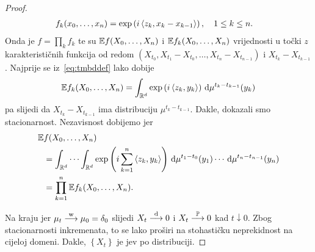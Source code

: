 \documentclass[main.tex]{subfiles}
\begin{document}
\begin{proof}
\begin{equation}
\begin{aligned}
			 & f_k(x_0, \ldots, x_n) = \exp \left( i \left\langle {z_k}, {x_k-x_{k-1}} \right\rangle \right), \quad 1 \le k \le n.
		\end{aligned}
	\end{equation}
	Onda je \( f = \prod_k f_k \) te su \( \mathbb{E} f(X_0, \ldots, X_n) \) i \( \mathbb{E} f_k(X_0, \ldots, X_n) \)
	vrijednosti u točki \( z \) karakterističnih funkcija od redom \( (X_{t_0}, X_{t_1}-X_{t_0},\ldots, X_{t_n}-X_{t_{n-1}}) \) i \( X_{t_k}-X_{t_{k-1}} \). Najprije se iz~\eqref{eq:tmbddef} lako dobije
	\begin{equation}
		\mathbb{E} f_k(X_0, \ldots, X_n) = \int_{\mathbb{R}^d} \exp\left(i\left\langle {z_k}, {y_k} \right\rangle\right) \,\mathrm d \mu^{t_k-t_{k-1}} (y_k)
	\end{equation}
	pa slijedi da \( X_{t_k}-X_{t_{k-1}} \) ima distribuciju \( \mu^{t_k-t_{k-1}} \). Dakle, dokazali smo stacionarnost. Nezavisnost dobijemo jer
	\begin{equation}
		\begin{aligned}
			\mathbb{E} & f(X_0, \ldots, X_n)                                                                \\
			   & = \int_{\mathbb{R}^d} \cdots \int_{\mathbb{R}^d} \exp \left( i \sum_{k=1}^n \left\langle {z_k}, {y_k} \right\rangle \right)
			\,\mathrm d \mu^{t_1-t_0}(y_1) \cdots \,\mathrm d \mu^{t_n-t_{n-1}} (y_n)                                 \\
			   & = \prod_{k=1}^n \mathbb{E} f_k(X_0, \ldots, X_n).
		\end{aligned}
	\end{equation}

	Na kraju jer \( \mu_t \stackrel{\mathrm w}{\longrightarrow} \mu_0 = \delta_0  \) slijedi \( X_t \stackrel{\mathrm d}{\longrightarrow} 0 \) i \( X_t \stackrel{\mathbb P}{\longrightarrow} 0 \) kad \( t \downarrow 0 \). Zbog stacionarnosti inkremenata, to se lako proširi na stohastičku neprekidnost na cijeloj domeni. Dakle, \( \left\{ X_t \right\} \) je \levy jev po distribuciji.
\end{proof}
\end{document}
